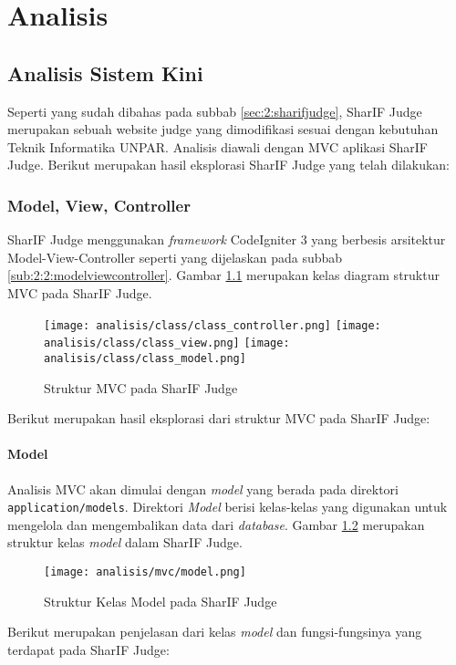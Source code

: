 \chapter{Analisis}
\label{chap:analisis}


\section{Analisis Sistem Kini}
\label{sec:3:sistemkini}

Seperti yang sudah dibahas pada subbab \ref{sec:2:sharifjudge}, SharIF Judge merupakan sebuah website judge yang dimodifikasi sesuai dengan kebutuhan Teknik Informatika UNPAR. Analisis diawali dengan MVC aplikasi SharIF Judge. Berikut merupakan hasil eksplorasi SharIF Judge yang telah dilakukan:

\subsection{Model, View, Controller}
\label{sub:3:1:modelviewcontroller}

SharIF Judge menggunakan \textit{framework} CodeIgniter 3 yang berbesis arsitektur Model-View-Controller seperti yang dijelaskan pada subbab \ref{sub:2:2:modelviewcontroller}. Gambar \ref{fig:3:1:mvc} merupakan kelas diagram struktur MVC pada SharIF Judge.

\begin{figure}[H]
	\centering
	\texttt{[image: analisis/class/class\_controller.png]}
	\texttt{[image: analisis/class/class\_view.png]}
	\texttt{[image: analisis/class/class\_model.png]}
	\caption{Struktur MVC pada SharIF Judge}
	\label{fig:3:1:mvc}
\end{figure}

Berikut merupakan hasil eksplorasi dari struktur MVC pada SharIF Judge:

\subsubsection{Model}
\label{sub:3:1:1:model}

Analisis MVC akan dimulai dengan \textit{model} yang berada pada direktori \verb|application/models|. Direktori \textit{Model} berisi kelas-kelas yang digunakan untuk mengelola dan mengembalikan data dari \textit{database}.
Gambar \ref{fig:3:1:1:model} merupakan struktur kelas \textit{model} dalam SharIF Judge.
\begin{figure}[H]
	\centering
	\texttt{[image: analisis/mvc/model.png]}
	\caption{Struktur Kelas Model pada SharIF Judge}
	\label{fig:3:1:1:model}
\end{figure}
Berikut merupakan penjelasan dari kelas \textit{model} dan fungsi-fungsinya yang terdapat pada SharIF Judge:


